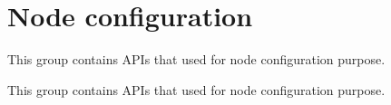 \hypertarget{group__node__configuration__group}{}\section{Node configuration}
\label{group__node__configuration__group}


This group contains A\+P\+Is that used for node configuration purpose.  


This group contains A\+P\+Is that used for node configuration purpose. 

